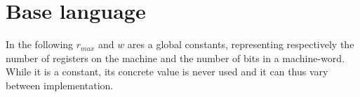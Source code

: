 \section{Base language}

In the following $r_{max}$ and $w$ ares a global constants, representing
respectively the number of registers on the machine and the number of bits in a
machine-word. While it is a constant, its concrete value is never used and it
can thus vary between implementation.
\\




